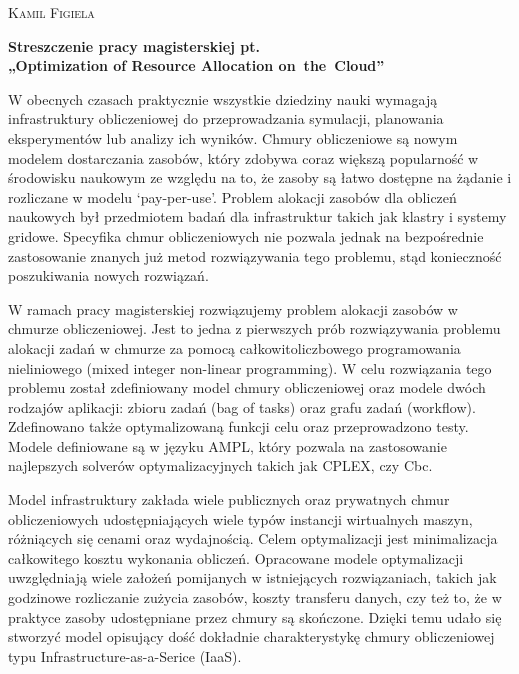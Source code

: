 \documentclass[11pt, a4paper]{article} %
\begin{document}
\onehalfspacing
\setlength{\parindent}{0pt}
\setlength{\parskip}{2.0ex plus0.5ex minus0.2ex}

\begin{center}
    \textsc{Kamil Figiela}
    
  
    \textbf{Streszczenie pracy magisterskiej pt. \\ „Optimization of Resource Allocation on~the~Cloud”}
\end{center}


W obecnych czasach praktycznie wszystkie dziedziny nauki wymagają infrastruktury obliczeniowej do przeprowadzania symulacji, planowania eksperymentów lub analizy ich wyników. Chmury obliczeniowe są nowym modelem dostarczania zasobów, który zdobywa coraz większą popularność w środowisku naukowym ze względu na to, że zasoby są łatwo dostępne na żądanie i rozliczane w modelu ‘pay-per-use’. Problem alokacji zasobów dla obliczeń naukowych był przedmiotem badań dla infrastruktur takich jak klastry i systemy gridowe. Specyfika chmur obliczeniowych nie pozwala jednak na bezpośrednie zastosowanie znanych już metod rozwiązywania tego problemu, stąd konieczność poszukiwania nowych rozwiązań.

W ramach pracy magisterskiej rozwiązujemy problem alokacji zasobów w chmurze obliczeniowej. Jest to jedna z pierwszych prób rozwiązywania problemu alokacji zadań w chmurze za pomocą całkowitoliczbowego programowania nieliniowego (mixed integer non-linear programming). W celu rozwiązania tego problemu został zdefiniowany model chmury obliczeniowej oraz modele dwóch rodzajów aplikacji: zbioru zadań (bag of tasks) oraz grafu zadań (workflow). Zdefinowano także optymalizowaną funkcji celu oraz przeprowadzono testy. Modele definiowane są w języku AMPL, który pozwala na zastosowanie najlepszych solverów optymalizacyjnych takich jak CPLEX, czy Cbc. 

Model infrastruktury zakłada wiele publicznych oraz prywatnych chmur obliczeniowych udostępniających wiele typów instancji wirtualnych maszyn, różniących się cenami oraz wydajnością. Celem optymalizacji jest minimalizacja całkowitego kosztu wykonania obliczeń. Opracowane modele optymalizacji uwzględniają wiele założeń pomijanych w istniejących rozwiązaniach, takich jak godzinowe rozliczanie zużycia zasobów, koszty transferu danych, czy też to, że w praktyce zasoby udostępniane przez chmury są skończone. Dzięki temu udało się stworzyć model opisujący dość dokładnie charakterystykę chmury obliczeniowej typu Infrastructure-as-a-Serice (IaaS).
\end{document}
